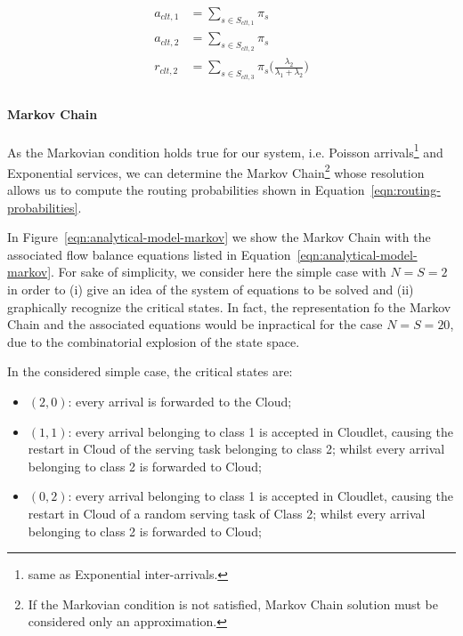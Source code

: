 \begin{equation} 
\begin{split}
a_{clt,1} & = \sum_{s\in S_{clt,1}} \pi_{s} \\
a_{clt,2} & = \sum_{s\in S_{clt,2}} \pi_{s} \\
r_{clt,2} & = \sum_{s\in S_{clt,3}} \pi_{s} \Big(\frac{\lambda_{2}}{\lambda_{1}+\lambda_{2}}\Big) \\
\end{split}
\label{eqn:routing-probabilities}
\end{equation}


\paragraph{Markov Chain}
As the Markovian condition holds true for our system, i.e. Poisson arrivals\footnote{same as Exponential inter-arrivals.} and Exponential services, we can determine the Markov Chain\footnote{If the Markovian condition is not satisfied, Markov Chain solution must be considered only an approximation.} whose resolution allows us to compute the routing probabilities shown in Equation~\ref{eqn:routing-probabilities}.

In Figure~\ref{eqn:analytical-model-markov} we show the Markov Chain with the associated flow balance equations listed in Equation~\ref{eqn:analytical-model-markov}.
For sake of simplicity, we consider here the simple case with $N=S=2$ in order to (i) give an idea of the system of equations to be solved and (ii) graphically recognize the critical states. In fact, the representation fo the Markov Chain and the associated equations would be inpractical for the case $N=S=20$, due to the combinatorial explosion of the state space.

In the considered simple case, the critical states are:

\begin{itemize}
	\item $(2,0)$: every arrival is forwarded to the Cloud;
	
	\item $(1,1)$: every arrival belonging to class 1 is accepted in Cloudlet, causing the restart in Cloud of the serving task belonging to class 2; whilst every arrival belonging to class 2 is forwarded to Cloud;
	
	\item $(0,2)$: every arrival belonging to class 1 is accepted in Cloudlet, causing the restart in Cloud of a random serving task of Class 2; whilst every arrival belonging to class 2 is forwarded to Cloud;
\end{itemize}

